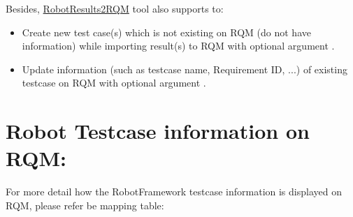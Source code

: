Besides,
\href{https://github.com/test-fullautomation/robotframework-testresult2rqmtool}{RobotResults2RQM}
tool also supports to:

\begin{itemize}
\tightlist
\item
  Create new test case(s) which is not existing on RQM (do not have
   information) while importing result(s) to RQM with
  optional argument .
\item
  Update information (such as testcase name, Requirement ID, ...) of
  existing testcase on RQM with optional argument
  .
\end{itemize}

\hypertarget{description-robot-testcase-information-on-rqm}{%
\section{Robot Testcase information on
RQM:}\label{description-robot-testcase-information-on-rqm}}

For more detail how the RobotFramework testcase information is displayed
on RQM, please refer be mapping table:

